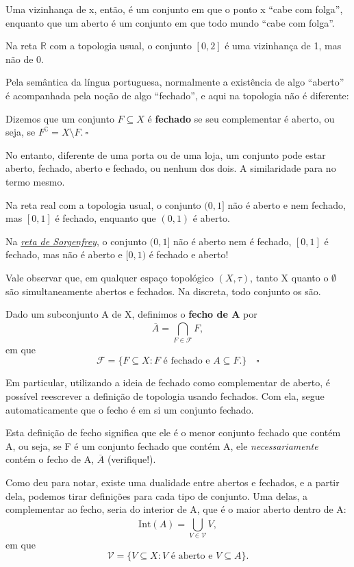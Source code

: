 \documentclass[../topology_notes.tex]{subfiles}
\begin{document}
Uma vizinhança de x, então, é um conjunto em que o ponto x ``cabe com folga'', enquanto que um aberto é um conjunto em que todo mundo ``cabe com folga''.
\begin{example}
	Na reta \(\mathbb{R}\) com a topologia usual, o conjunto \([0, 2]\) é uma vizinhança de 1, mas não de 0.
\end{example}

Pela semântica da língua portuguesa, normalmente a existência de algo ``aberto'' é acompanhada pela noção de algo ``fechado'', e aqui na topologia não é diferente:
\begin{def*}
	Dizemos que um conjunto \(F\subseteq X\) é \textbf{fechado} se seu complementar é aberto, ou seja, se \(F ^{\complement}=X\setminus{F}.\:\square\)
\end{def*}
No entanto, diferente de uma porta ou de uma loja, um conjunto pode estar aberto, fechado, aberto e fechado, ou nenhum dos dois. A similaridade para no termo mesmo.
\begin{example}
	Na reta real com a topologia usual, o conjunto \((0, 1]\) não é aberto e nem fechado, mas \([0, 1]\) é fechado, enquanto que \((0, 1)\) é aberto.

	Na \hyperlink{sorgenfrey}{\textit{reta de Sorgenfrey}}, o conjunto \((0, 1]\) não é aberto nem é fechado, \([0, 1]\) é fechado, mas não é aberto e \([0, 1)\) é fechado e aberto!
\end{example}
Vale observar que, em qualquer espaço topológico \((X, \tau )\), tanto X quanto o \(\emptyset \) são simultaneamente abertos e fechados. Na discreta, todo conjunto os são.

\begin{def*}
	Dado um subconjunto A de X, definimos o \textbf{fecho de A} por
	\[
		\overline{A} = \bigcap_{F\in \mathcal{F}}^{}F,
	\]
	em que
	\[
		\mathcal{F} = \{F\subseteq X: F \text{ é fechado e }A\subseteq F.\}\quad \square
	\]
\end{def*}
Em particular, utilizando a ideia de fechado como complementar de aberto, é possível reescrever a definição de topologia usando fechados. Com ela, segue automaticamente que o fecho é em si um conjunto fechado.

Esta definição de fecho significa que ele é o menor conjunto fechado que contém A, ou seja, se F é um conjunto fechado que contém A, ele \textit{necessariamente} contém o fecho de A, \(\overline{A}\) (verifique!).

Como deu para notar, existe uma dualidade entre abertos e fechados, e a partir dela, podemos tirar definições para cada tipo de conjunto. Uma delas, a complementar ao fecho, seria do interior de A, que é o maior aberto dentro de A:
\[
	\mathrm{Int}(A) = \bigcup_{V\in \mathcal{V}}^{}V,
\]
em que
\[
	\mathcal{V} = \{V\subseteq X: V \text{ é aberto e }V\subseteq A\}.
\]
\end{document}
